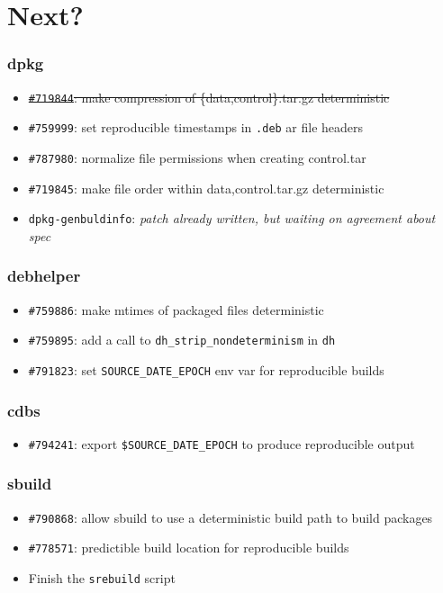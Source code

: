 \documentclass[14pt]{beamer}
\begin{document}
\section{Next?}

\begin{frame}
 \frametitle{dpkg}

 \begin{itemize}\small
  \item \sout{\texttt{\#719844}: make compression of \{data,control\}.tar.gz deterministic}
  \item \texttt{\#759999}: set reproducible timestamps in \texttt{.deb} ar file headers
  \item \texttt{\#787980}: normalize file permissions when creating control.tar
  \item \texttt{\#719845}: make file order within {data,control}.tar.gz deterministic
  \item \texttt{dpkg-genbuldinfo}: \textit{patch already written, but waiting on agreement about spec}
 \end{itemize}
\end{frame}

\begin{frame}
 \frametitle{debhelper}

 \begin{itemize}\small
  \item \texttt{\#759886}: make mtimes of packaged files deterministic
  \item \texttt{\#759895}: add a call to \texttt{dh\_strip\_nondeterminism} in \texttt{dh}
  \item \texttt{\#791823}: set \texttt{SOURCE\_DATE\_EPOCH} env var for reproducible builds
 \end{itemize}
\end{frame}

\begin{frame}
 \frametitle{cdbs}

 \begin{itemize}\small
  \item \texttt{\#794241}: export \texttt{\$SOURCE\_DATE\_EPOCH} to produce reproducible output
 \end{itemize}
\end{frame}

\begin{frame}
 \frametitle{sbuild}

 \begin{itemize}\small
  \item \texttt{\#790868}: allow sbuild to use a deterministic build path to build packages
  \item \texttt{\#778571}: predictible build location for reproducible builds
  \item Finish the \texttt{srebuild} script
 \end{itemize}
\end{frame}
\end{document}

